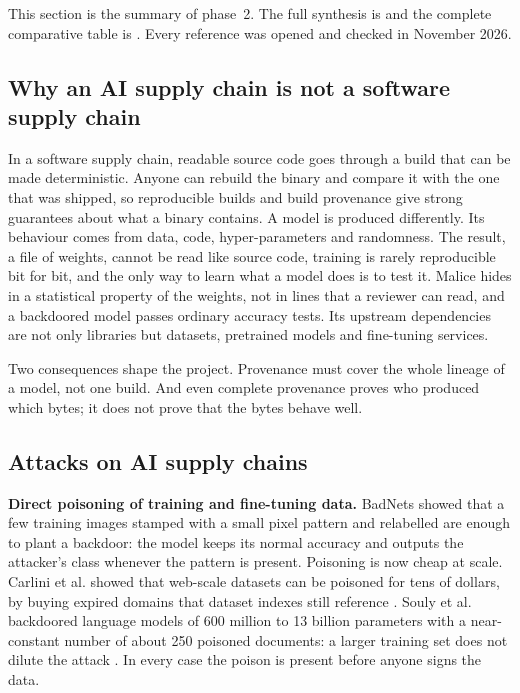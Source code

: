 
This section is the summary of phase~2. The full synthesis is  and the
complete comparative table is . Every reference was opened and checked
in November 2026.

\subsection{Why an AI supply chain is not a software supply chain}
In a software supply chain, readable source code goes through a build that can be made deterministic. Anyone can
rebuild the binary and compare it with the one that was shipped, so reproducible builds and build provenance
give strong guarantees about what a binary contains. A model is produced differently. Its behaviour comes from
data, code, hyper-parameters and randomness. The result, a file of weights, cannot be read like source code,
training is rarely reproducible bit for bit, and the only way to learn what a model does is to test it. Malice
hides in a statistical property of the weights, not in lines that a reviewer can read, and a backdoored model
passes ordinary accuracy tests. Its upstream dependencies are not only libraries but datasets, pretrained
models and fine-tuning services.

Two consequences shape the project. Provenance must cover the whole lineage of a model, not one build. And even
complete provenance proves who produced which bytes; it does not prove that the bytes behave well.

\subsection{Attacks on AI supply chains}
\textbf{Direct poisoning of training and fine-tuning data.} BadNets \cite{badnets} showed that a few training
images stamped with a small pixel pattern and relabelled are enough to plant a backdoor: the model keeps its
normal accuracy and outputs the attacker's class whenever the pattern is present. Poisoning is now cheap at
scale. Carlini et al. showed that web-scale datasets can be poisoned for tens of dollars, by buying expired
domains that dataset indexes still reference \cite{carlini2024}. Souly et al. backdoored language models of
600 million to 13 billion parameters with a near-constant number of about 250 poisoned documents: a larger
training set does not dilute the attack \cite{souly2025}. In every case the poison is present before anyone
signs the data.

